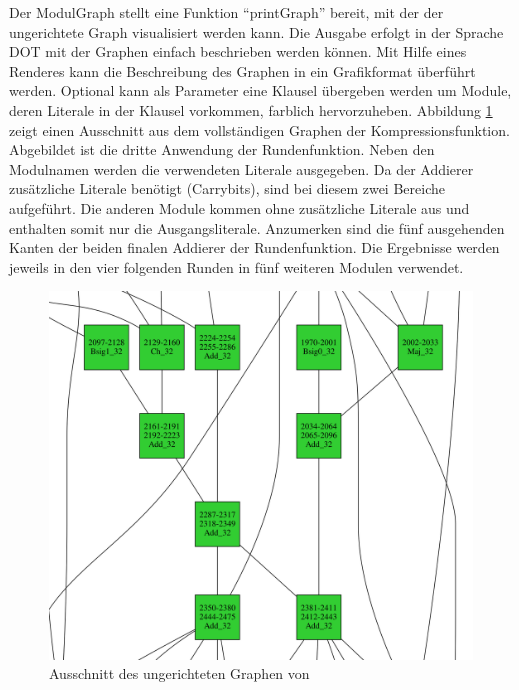 Der ModulGraph stellt eine Funktion "`printGraph"' bereit, mit der der ungerichtete Graph visualisiert werden kann. Die Ausgabe erfolgt in der Sprache DOT \cite{lang:dot}
mit der Graphen einfach beschrieben werden können. Mit Hilfe eines Renderes kann die Beschreibung des Graphen in ein Grafikformat überführt werden.
Optional kann als Parameter eine Klausel übergeben werden um Module, deren Literale in der Klausel vorkommen, farblich hervorzuheben. Abbildung \ref{fig:sha256_graph}
zeigt einen Ausschnitt aus dem vollständigen Graphen der Kompressionsfunktion. Abgebildet ist die dritte Anwendung der Rundenfunktion. Neben den
Modulnamen werden die verwendeten Literale ausgegeben. Da der Addierer zusätzliche Literale benötigt (Carrybits), sind bei diesem zwei Bereiche aufgeführt.
Die anderen Module kommen ohne zusätzliche Literale aus und enthalten somit nur die Ausgangsliterale. Anzumerken sind die fünf ausgehenden Kanten der beiden
finalen Addierer der Rundenfunktion. Die Ergebnisse werden jeweils in den vier folgenden Runden in fünf weiteren Modulen verwendet.
\begin{figure}[!h]
  \centering
  \includegraphics[scale=0.43]{images/sha256graph}
  \caption{Ausschnitt des ungerichteten Graphen von }
  \label{fig:sha256_graph}
\end{figure}

